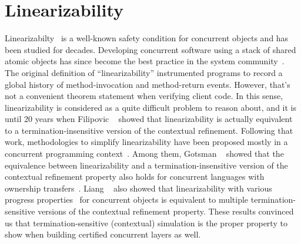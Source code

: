 \section{Linearizability}
\label{chatper:related:sec:linearizability}


Linearizabilty~\cite{herlihy90}  is a well-known safety condition for concurrent objects 
and has been studied for decades. 
Developing concurrent software using a stack of shared atomic objects has since
become the best practice in the system
community~\cite{Herlihy08book,ospp11}. 
The original definition of ``linearizability'' instrumented programs
to record a global history of method-invocation and method-return
events. However, that's not a convenient theorem statement when
verifying client code.
In this sense,
linearizability is considered as a quite 
difficult problem to reason about, and it is until 20 years when 
Filipovic \etal~\cite{filipovic10} showed that linearizability is actually equivalent
to a termination-insensitive version of the contextual refinement.
Following that work, methodologies to simplify linearizability have been
proposed mostly in a concurrent programming context~\cite{Elmas10tacas,
Liang13pldi,Gotsman12concur,Viktor10CAV}.
Among them, Gotsman \etal~\cite{Gotsman12concur} showed that the equivalence between linearizability and a termination-insensitive version of the contextual refinement property also
holds for concurrent languages with ownership transfers~\cite{ohearn:concur04}.  
Liang \etal~\cite{liang13,lili16} also showed that linearizability with various
progress properties~\cite{Herlihy08book} for concurrent objects is
equivalent to multiple termination-sensitive versions of the contextual refinement property. 
These results convinced us that 
termination-sensitive (contextual) simulation is the proper property to show
when building certified
concurrent layers as well.

